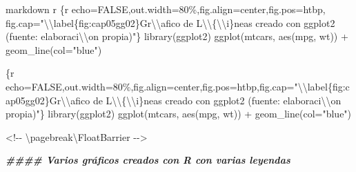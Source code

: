 \documentclass[11pt,a4paper,oneside,]{article}
\newenvironment{Shaded}{\begin{snugshade}}{\end{snugshade}}
\newcommand{\AttributeTok}[1]{\textcolor[rgb]{0.77,0.63,0.00}{#1}}
\newcommand{\DocumentationTok}[1]{\textcolor[rgb]{0.56,0.35,0.01}{\textbf{\textit{#1}}}}
\newcommand{\NormalTok}[1]{#1}
\newcommand{\OtherTok}[1]{\textcolor[rgb]{0.56,0.35,0.01}{#1}}
\newcommand{\SpecialCharTok}[1]{\textcolor[rgb]{0.00,0.00,0.00}{#1}}
\newcommand{\StringTok}[1]{\textcolor[rgb]{0.31,0.60,0.02}{#1}}
\numberwithin{dummy}{section}
\theoremstyle{ocrenumbox}
\theoremstyle{blacknumex}
\theoremstyle{blacknumbox}
\theoremstyle{ocrenum}
\theoremstyle{ocrenum}
\begin{document}
\begin{Shaded}
\begin{Highlighting}[numbers=left,,]
\StringTok{\textasciigrave{}\textasciigrave{}\textasciigrave{}\textasciigrave{}}\NormalTok{markdown}
\StringTok{\textasciigrave{}}\AttributeTok{r \textquotesingle{}\textquotesingle{}}\StringTok{\textasciigrave{}\textasciigrave{}\textasciigrave{}\textasciigrave{}}\AttributeTok{\{r echo=FALSE,out.width=\textquotesingle{}80\%\textquotesingle{},fig.align=\textquotesingle{}center\textquotesingle{},fig.pos=\textquotesingle{}htbp\textquotesingle{},}
\AttributeTok{fig.cap="}\SpecialCharTok{\textbackslash{}\textbackslash{}}\AttributeTok{label\{fig:cap05gg02\}Gr}\SpecialCharTok{\textbackslash{}\textbackslash{}}\AttributeTok{\textquotesingle{}afico de L}\SpecialCharTok{\textbackslash{}\textbackslash{}}\AttributeTok{\textquotesingle{}\{}\SpecialCharTok{\textbackslash{}\textbackslash{}}\AttributeTok{i\}neas creado }
\AttributeTok{         con ggplot2 (fuente: elaboraci}\SpecialCharTok{\textbackslash{}\textbackslash{}}\AttributeTok{\textquotesingle{}on propia)"\}}
\AttributeTok{library(ggplot2)}
\AttributeTok{ggplot(mtcars, aes(mpg, wt)) + }
\AttributeTok{  geom\_line(col="blue")}
\StringTok{\textasciigrave{}\textasciigrave{}\textasciigrave{}}
\StringTok{\textasciigrave{}\textasciigrave{}\textasciigrave{}\textasciigrave{}}

\StringTok{\textasciigrave{}\textasciigrave{}\textasciigrave{}}\AttributeTok{\{r echo=FALSE,out.width=\textquotesingle{}80\%\textquotesingle{},fig.align=\textquotesingle{}center\textquotesingle{},fig.pos=\textquotesingle{}htbp\textquotesingle{},fig.cap="}\SpecialCharTok{\textbackslash{}\textbackslash{}}\AttributeTok{label\{fig:cap05gg02\}Gr}\SpecialCharTok{\textbackslash{}\textbackslash{}}\AttributeTok{\textquotesingle{}afico de L}\SpecialCharTok{\textbackslash{}\textbackslash{}}\AttributeTok{\textquotesingle{}\{}\SpecialCharTok{\textbackslash{}\textbackslash{}}\AttributeTok{i\}neas creado con ggplot2 (fuente: elaboraci}\SpecialCharTok{\textbackslash{}\textbackslash{}}\AttributeTok{\textquotesingle{}on propia)"\}}
\AttributeTok{library(ggplot2)}
\AttributeTok{ggplot(mtcars, aes(mpg, wt)) + }
\AttributeTok{  geom\_line(col="blue")}
\StringTok{\textasciigrave{}\textasciigrave{}\textasciigrave{}}





\SpecialCharTok{\textless{}!{-}{-}}\NormalTok{ \textbackslash{}pagebreak\textbackslash{}FloatBarrier }\SpecialCharTok{{-}}\OtherTok{{-}\textgreater{}}

\DocumentationTok{\#\#\#\# Varios gráficos creados con R con varias leyendas}


\end{Highlighting}
\end{Shaded}
\end{document}
